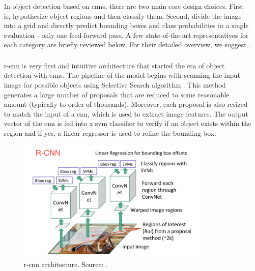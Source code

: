         In object detection based on \gls{cnn}s, there are two main core design choices. First is, hypothesize object regions and then classify them. Second, divide the image into a grid and directly predict bounding boxes and class probabilities in a single evaluation - only one feed-forward pass. A few state-of-the-art representatives for each category are briefly reviewed below. For their detailed overview, we suggest \cite{huang2017speed, xuobjectdetection, ouaknineobjectdetection}.
        
        \subsubsection{}
            \Gls{r-cnn} \cite{girshick2016region} is very first and intuitive architecture that started the era of object detection with \gls{cnn}s. The pipeline of the model begins with scanning the input image for possible objects using Selective Search algorithm \cite{uijlings2013selective}. This method generates a large number of proposals that are reduced to some reasonable amount (typically to order of thousands). Moreover, each proposal is also resized to match the input of a \gls{cnn}, which is used to extract image features. The output vector of the \gls{cnn} is fed into a \gls{svm} classifier to verify if an object exists within the region and if yes, a linear regressor is used to refine the bounding box.
            
            \begin{figure}[ht]
                \centering
                \includegraphics[width=0.85\textwidth]{resources/r_cnn_architecture.png}
                \caption{\Gls{r-cnn} architecture. Source: \cite{xuobjectdetection}.}
                \label{fig:r-cnn architecture}
            \end{figure}
        
